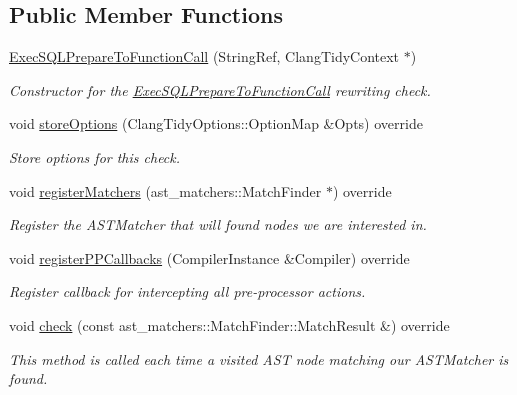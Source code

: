 \subsection*{Public Member Functions}
\begin{DoxyCompactItemize}
\item 
\hyperlink{classclang_1_1tidy_1_1pagesjaunes_1_1_exec_s_q_l_prepare_to_function_call_a7075e59992f7f1c53938e30d7f6831e5}{Exec\+S\+Q\+L\+Prepare\+To\+Function\+Call} (String\+Ref, Clang\+Tidy\+Context $\ast$)
\begin{DoxyCompactList}\small\item\em Constructor for the \hyperlink{classclang_1_1tidy_1_1pagesjaunes_1_1_exec_s_q_l_prepare_to_function_call}{Exec\+S\+Q\+L\+Prepare\+To\+Function\+Call} rewriting check. \end{DoxyCompactList}\item 
void \hyperlink{classclang_1_1tidy_1_1pagesjaunes_1_1_exec_s_q_l_prepare_to_function_call_adc3a382dec4397a4b66b1efa40cb6951}{store\+Options} (Clang\+Tidy\+Options\+::\+Option\+Map \&Opts) override
\begin{DoxyCompactList}\small\item\em Store options for this check. \end{DoxyCompactList}\item 
void \hyperlink{classclang_1_1tidy_1_1pagesjaunes_1_1_exec_s_q_l_prepare_to_function_call_ae7f0744dde86411b9dd0a5a1cdbec313}{register\+Matchers} (ast\+\_\+matchers\+::\+Match\+Finder $\ast$) override
\begin{DoxyCompactList}\small\item\em Register the A\+S\+T\+Matcher that will found nodes we are interested in. \end{DoxyCompactList}\item 
void \hyperlink{classclang_1_1tidy_1_1pagesjaunes_1_1_exec_s_q_l_prepare_to_function_call_a0d6cac5b6419388f98ec398ba48db8c2}{register\+P\+P\+Callbacks} (Compiler\+Instance \&Compiler) override
\begin{DoxyCompactList}\small\item\em Register callback for intercepting all pre-\/processor actions. \end{DoxyCompactList}\item 
void \hyperlink{classclang_1_1tidy_1_1pagesjaunes_1_1_exec_s_q_l_prepare_to_function_call_a113ff5dac44508cad49d6ae7e9688008}{check} (const ast\+\_\+matchers\+::\+Match\+Finder\+::\+Match\+Result \&) override
\begin{DoxyCompactList}\small\item\em This method is called each time a visited A\+ST node matching our A\+S\+T\+Matcher is found. \end{DoxyCompactList}\item 

\end{DoxyCompactItemize}

